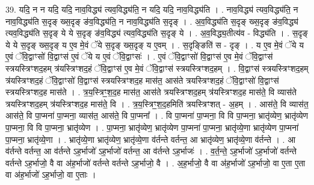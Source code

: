 \documentclass[17pt]{extarticle}
\begin{document}
39. यदि॒ न न यदि॒ यदि॒ नाव॒विद्ध्य॑ त्यव॒विद्ध्य॑ति॒ न यदि॒ यदि॒ नाव॒विद्ध्य॑ति । . नाव॒विद्ध्य॑ त्यव॒विद्ध्य॑ति॒ न नाव॒विद्ध्य॑ति स॒दृङ् ख्स॒दृङ् ङ॑व॒विद्ध्य॑ति॒ न नाव॒विद्ध्य॑ति स॒दृङ् । . अ॒व॒विद्ध्य॑ति स॒दृङ् ख्स॒दृङ् ङ॑व॒विद्ध्य॑ त्यव॒विद्ध्य॑ति स॒दृङ् ये ये स॒दृङ् ङ॑व॒विद्ध्य॑ त्यव॒विद्ध्य॑ति स॒दृङ् ये । . अ॒व॒विद्ध्य॒तीत्य॑व - विद्ध्य॑ति । . स॒दृङ् ये ये स॒दृङ् ख्स॒दृङ् य ए॒व मे॒वं ॅये स॒दृङ् ख्स॒दृङ् य ए॒वम् । . स॒दृङ्ङिति॑ स - दृङ् । . य ए॒व मे॒वं ॅये य ए॒वं ॅवि॒द्वाꣳसो॑ वि॒द्वाꣳस॑ ए॒वं ॅये य ए॒वं ॅवि॒द्वाꣳसः॑ । . ए॒वं ॅवि॒द्वाꣳसो॑ वि॒द्वाꣳस॑ ए॒व मे॒वं ॅवि॒द्वाꣳस॑ स्त्रयस्त्रिꣳशद॒हम् त्र॑यस्त्रिꣳशद॒हं ॅवि॒द्वाꣳस॑ ए॒व मे॒वं ॅवि॒द्वाꣳस॑ स्त्रयस्त्रिꣳशद॒हम् । . वि॒द्वाꣳस॑ स्त्रयस्त्रिꣳशद॒हम् त्र॑यस्त्रिꣳशद॒हं ॅवि॒द्वाꣳसो॑ वि॒द्वाꣳस॑ स्त्रयस्त्रिꣳशद॒ह मास॑त॒ आस॑ते त्रयस्त्रिꣳशद॒हं ॅवि॒द्वाꣳसो॑ वि॒द्वाꣳस॑ स्त्रयस्त्रिꣳशद॒ह मास॑ते । . त्र॒य॒स्त्रिꣳ॒॒श॒द॒ह मास॑त॒ आस॑ते त्रयस्त्रिꣳशद॒हम् त्र॑यस्त्रिꣳशद॒ह मास॑ते॒ वि व्यास॑ते त्रयस्त्रिꣳशद॒हम् त्र॑यस्त्रिꣳशद॒ह मास॑ते॒ वि । . त्र॒य॒स्त्रिꣳ॒॒श॒द॒हमिति॑ त्रयस्त्रिꣳशत् - अ॒हम् । . आस॑ते॒ वि व्यास॑त॒ आस॑ते॒ वि पा॒प्मना॑ पा॒प्मना॒ व्यास॑त॒ आस॑ते॒ वि पा॒प्मना᳚ । . वि पा॒प्मना॑ पा॒प्मना॒ वि वि पा॒प्मना॒ भ्रातृ॑व्येण॒ भ्रातृ॑व्येण पा॒प्मना॒ वि वि पा॒प्मना॒ भ्रातृ॑व्येण । . पा॒प्मना॒ भ्रातृ॑व्येण॒ भ्रातृ॑व्येण पा॒प्मना॑ पा॒प्मना॒ भ्रातृ॑व्ये॒णा भ्रातृ॑व्येण पा॒प्मना॑ पा॒प्मना॒ भ्रातृ॑व्ये॒णा । . भ्रातृ॑व्ये॒णा भ्रातृ॑व्येण॒ भ्रातृ॑व्ये॒णा व॑र्तन्ते वर्तन्त॒ आ भ्रातृ॑व्येण॒ भ्रातृ॑व्ये॒णा व॑र्तन्ते । . आ व॑र्तन्ते वर्तन्त॒ आ व॑र्तन्ते ऽह॒र्भाजो॑ ऽह॒र्भाजो॑ वर्तन्त॒ आ व॑र्तन्ते ऽह॒र्भाजः॑ । . व॒र्त॒न्ते॒ ऽह॒र्भाजो॑ ऽह॒र्भाजो॑ वर्तन्ते वर्तन्ते ऽह॒र्भाजो॒ वै वा अ॑ह॒र्भाजो॑ वर्तन्ते वर्तन्ते ऽह॒र्भाजो॒ वै । . अ॒ह॒र्भाजो॒ वै वा अ॑ह॒र्भाजो॑ ऽह॒र्भाजो॒ वा ए॒ता ए॒ता वा अ॑ह॒र्भाजो॑ ऽह॒र्भाजो॒ वा ए॒ताः । \newline
\end{document}
